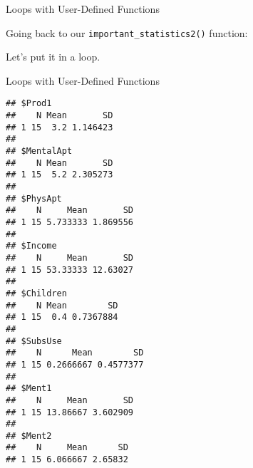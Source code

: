 \begin{frame}[fragile]{Loops with User-Defined Functions}

Going back to our \texttt{important\_statistics2()} function:

\begin{Shaded}
\begin{Highlighting}[]
\StringTok{ }\NormalTok{)\{}
\StringTok{ }
\StringTok{ }
\StringTok{ }
  
\StringTok{ }
\NormalTok{\}}
\end{Highlighting}
\end{Shaded}

Let's put it in a loop.

\end{frame}

\begin{frame}[fragile]{Loops with User-Defined Functions}

\begin{Shaded}
\begin{Highlighting}[]
\end{Highlighting}
\end{Shaded}

\begin{verbatim}
## $Prod1
##    N Mean       SD
## 1 15  3.2 1.146423
## 
## $MentalApt
##    N Mean       SD
## 1 15  5.2 2.305273
## 
## $PhysApt
##    N     Mean       SD
## 1 15 5.733333 1.869556
## 
## $Income
##    N     Mean       SD
## 1 15 53.33333 12.63027
## 
## $Children
##    N Mean        SD
## 1 15  0.4 0.7367884
## 
## $SubsUse
##    N      Mean        SD
## 1 15 0.2666667 0.4577377
## 
## $Ment1
##    N     Mean       SD
## 1 15 13.86667 3.602909
## 
## $Ment2
##    N     Mean      SD
## 1 15 6.066667 2.65832
\end{verbatim}

\end{frame}

